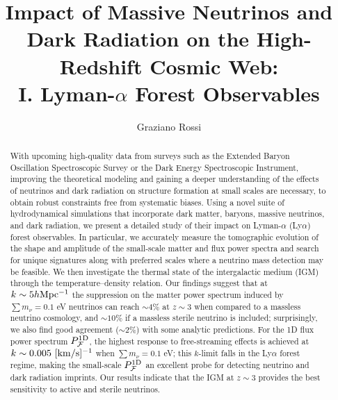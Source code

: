 \documentclass{emulateapj}
\begin{document}
\title{Impact of Massive Neutrinos and Dark Radiation on the High-Redshift Cosmic Web: \\ I. Lyman-$\alpha$ Forest Observables}
\author{Graziano Rossi}



\begin{abstract}

With upcoming high-quality  data from  
surveys such as 
the Extended Baryon Oscillation Spectroscopic Survey or the
Dark Energy Spectroscopic Instrument, improving the theoretical modeling and gaining a deeper  
understanding of the effects of 
neutrinos and dark radiation on structure formation at small scales 
are necessary, to 
obtain robust constraints 
free from systematic biases. 
Using a novel suite of 
hydrodynamical simulations that incorporate 
 dark matter, baryons,
massive neutrinos, and dark radiation, 
we present a detailed study of their impact on  Lyman-$\alpha$ (Ly$\alpha$) 
forest observables. In particular, we accurately measure 
the tomographic evolution of the shape and amplitude of the small-scale matter and flux power spectra
and search for unique signatures 
along with preferred scales where a 
neutrino mass detection may be feasible. We then 
investigate the thermal state of the intergalactic medium (IGM) through the temperature--density relation. 
Our findings suggest that 
 at  $k \sim 5h{\rm Mpc^{-1}}$ the suppression 
on the matter power spectrum induced by $\sum m_{\nu}=0.1$ eV  neutrinos  
can reach 
$\sim 4\%$  at $z\sim 3$ when compared to a massless neutrino cosmology,
and $\sim 10\%$ if a massless sterile neutrino is included;  
surprisingly,  we also find  
good agreement ($\sim 2\%$)  
with some analytic 
predictions.
For the 1D flux power spectrum $P_{{\cal{F}}}^{\rm 1D}$, 
the highest response
to free-streaming effects is achieved at 
$k \sim 0.005~{\rm [km/s]^{-1}}$ when $\sum m_{\nu}=0.1$ eV; 
this $k$-limit falls 
in the Ly$\alpha$ forest regime, 
making the small-scale $P_{{\cal{F}}}^{\rm 1D}$
an excellent probe for detecting
neutrino and dark radiation imprints.  
Our results indicate
that the IGM at $z\sim3$ provides the best sensitivity to active and sterile neutrinos.

\end{abstract}
\end{document}
